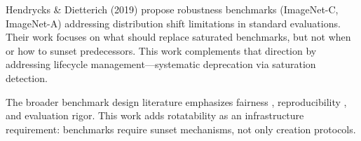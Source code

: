 
Hendrycks \& Dietterich (2019) propose robustness benchmarks (ImageNet-C, ImageNet-A) addressing distribution shift limitations in standard evaluations. Their work focuses on what should replace saturated benchmarks, but not when or how to sunset predecessors. This work complements that direction by addressing lifecycle management---systematic deprecation via saturation detection.

The broader benchmark design literature emphasizes fairness \citep{Gebru2018}, reproducibility \citep{Pineau2021Reproducibility}, and evaluation rigor. This work adds rotatability as an infrastructure requirement: benchmarks require sunset mechanisms, not only creation protocols.
